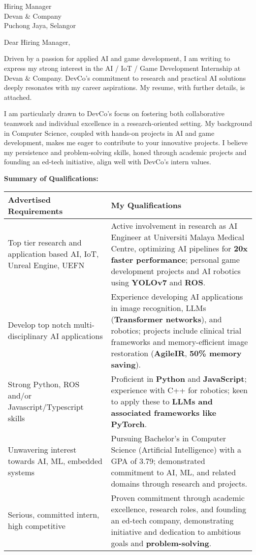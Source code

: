 \documentclass[10.5pt]{letter}
\date{\today}
\begin{document}
\begin{letter}{Hiring Manager\\Devan \& Company\\Puchong Jaya, Selangor}

\opening{Dear Hiring Manager,}

Driven by a passion for applied AI and game development, I am writing to express my strong interest in the AI / IoT / Game Development Internship at Devan \& Company.  DevCo's commitment to research and practical AI solutions deeply resonates with my career aspirations. My resume, with further details, is attached.

I am particularly drawn to DevCo's focus on fostering both collaborative teamwork and individual excellence in a research-oriented setting. My background in Computer Science, coupled with hands-on projects in AI and game development, makes me eager to contribute to your innovative projects.  I believe my persistence and problem-solving skills, honed through academic projects and founding an ed-tech initiative, align well with DevCo's intern values.

\vspace{0.3cm}
\textbf{Summary of Qualifications:}
\vspace{0.2cm}

\renewcommand{\arraystretch}{1.3}
\begin{tabularx}{\textwidth}{@{}p{}X@{}}
\textbf{Advertised Requirements} & \textbf{My Qualifications} \\
\hline
Top tier research and application based AI, IoT, Unreal Engine, UEFN & Active involvement in research as AI Engineer at Universiti Malaya Medical Centre, optimizing AI pipelines for \textbf{20x faster performance}; personal game development projects and AI robotics using \textbf{YOLOv7} and \textbf{ROS}. \\
Develop top notch multi-disciplinary AI applications & Experience developing AI applications in image recognition, LLMs (\textbf{Transformer networks}), and robotics; projects include clinical trial frameworks and memory-efficient image restoration (\textbf{AgileIR}, \textbf{50\% memory saving}). \\
Strong Python, ROS and/or Javascript/Typescript skills & Proficient in \textbf{Python} and \textbf{JavaScript}; experience with C++ for robotics; keen to apply these to \textbf{LLMs and associated frameworks like PyTorch}. \\
Unwavering interest towards AI, ML, embedded systems & Pursuing Bachelor's in Computer Science (Artificial Intelligence) with a GPA of 3.79; demonstrated commitment to AI, ML, and related domains through research and projects. \\
Serious, committed intern, high competitive &  Proven commitment through academic excellence, research roles, and founding an ed-tech company, demonstrating initiative and dedication to ambitious goals and \textbf{problem-solving}. \\
\end{tabularx}


\end{letter}
\end{document}
